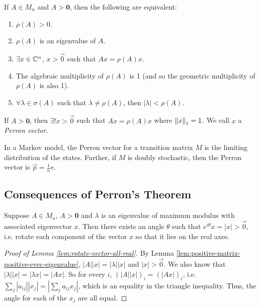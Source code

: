 \begin{theorem}[Perron]
\label{thm:Perron}
If $A \in M_n$ and $A > \mathbf{0}$, then the following are equivalent:
\begin{enumerate}
    \item $\rho(A) > 0$.
    \item $\rho(A)$ is an eigenvalue of $A$.
    \item $\exists x \in \mathbb C^n$, $x > \Vec{0}$ such that $Ax = \rho(A)x$.
    \item The algebraic multiplicity of $\rho(A)$ is 1 (and so the geometric multiplicity of $\rho(A)$ is also 1).
    \item $\forall\lambda\in\sigma(A)$ such that $\lambda\not=\rho(A)$, then $|\lambda|<\rho(A)$.
\end{enumerate}
\end{theorem}

\begin{definition}
\label{def:Perron-vector}
If $A > \mathbf{0}$, then $\exists! x>\Vec{0}$ such that $Ax = \rho(A)x$ where $\left\lVert x\right\rVert_1 = 1$. We call $x$ a \textit{Perron vector}.
\end{definition}

\begin{note*}
In a Markov model, the Perron vector for a transition matrix $M$ is the limiting distribution of the states. Further, if $M$ is doubly stochastic, then the Perron vector is $\Vec{p} = \frac{1}{n}\mathrm{e}$.
\end{note*}

\subsection{Consequences of Perron's Theorem}
\begin{lemma}
\label{lem:rotate-vector-all-real}
Suppose $A \in M_n$, $A > \mathbf{0}$ and $\lambda$ is an eigenvalue of maximum modulus with associated eigenvector $x$. Then there exists an angle $\theta$ such that $e^{i\theta}x = |x| > \Vec{0}$, i.e. rotate each component of the vector $x$ so that it lies on the real axes.
\end{lemma}
\begin{proof}[Proof of Lemma \ref{lem:rotate-vector-all-real}]
By Lemma \ref{lem:positive-matrix-positive-evec-eigenvalue}, $|A||x| = |\lambda||x|$ and $|x| > \Vec{0}$. We also know that $|\lambda||x| = |\lambda x| = |Ax|$. So for every $i$, $\left(|A||x|\right)_i = \left(|Ax|\right)_i$, i.e. $\sum_j |a_{ij}||x_j| = |\sum_j a_{ij}x_j|$, which is an equality in the triangle inequality. Thus, the angle for each of the $x_j$ are all equal.
\end{proof}

